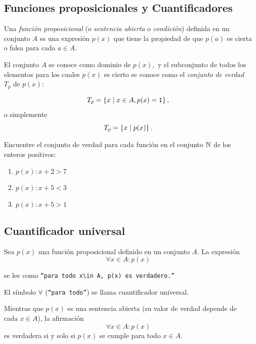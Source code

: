 \subsection{Funciones proposicionales y Cuantificadores}


 Una \emph{funci\'on proposicional} (o \emph{sentencia abierta} o \emph{condici\'on}) definida en un conjunto $A$ es una expresi\'on $p(x)$ que tiene la propiedad de que $p(a)$ es cierta o falsa para cada $a \in A.$



 El conjunto $A$ se conoce como dominio de $p(x),$ y el subconjunto de todos los elementos para los cuales $p(x)$ es cierto se conoce como el \emph{conjunto de verdad} $T_{p}$ de $p(x):$
 
 $$T_{p}=\left\{ x \mid x\in A, p(x)=\texttt{1} \right\},$$ 
 o simplemente 
 $$
 T_{p}=\left\{ x \mid p(x) \right\}.
 $$



 \begin{problema}
  \label{lip:exmp:4.7}
  Encuentre el conjunto de verdad para cada funci\'on en el conjunto $\mathbb{N}$ de los enteros positivos:
  \begin{enumerate}
   \item $p(x): x+2>7$ 
   \item $p(x): x+5<3$ 
   \item $p(x): x+5>1$ 
  \end{enumerate}

 \end{problema}



\subsection{Cuantificador universal}


 Sea $p(x)$ una funci\'on proposicional definido en un conjunto $A.$ La expresi\'on
 \begin{equation}
 \label{lip:4.1}
   \forall x \in A: p(x)
 \end{equation}

 
 se lee como  \texttt{``para todo $x\in A,$ $p(x)$ es verdadero.''}  
 
 El s\'imbolo $\forall$ (\texttt{``para todo''}) se llama cuantificador universal.




 Mientras que $p(x)$ es una sentencia abierta (su valor de verdad depende de cada $x\in A$), la afirmaci\'on 
 $$\forall x\in A: p(x)$$ es verdadera si y solo si $p(x)$ se cumple para todo $x\in A.$  



